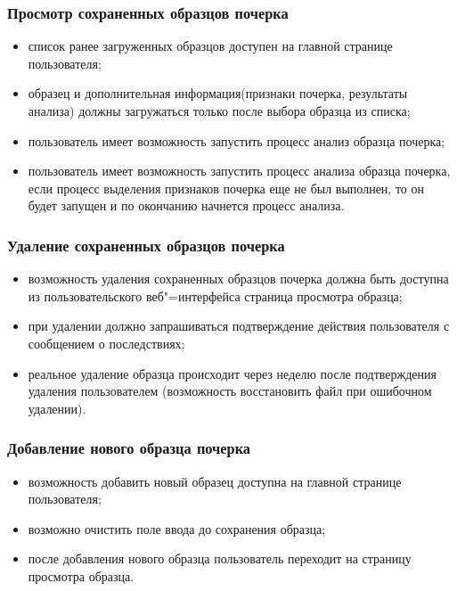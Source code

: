 \subsubsection{Просмотр сохраненных образцов почерка}
\label{sec:freq:show}
\begin{itemize}
	\item список ранее загруженных образцов доступен на главной странице пользователя;
	\item образец и дополнительная информация(признаки почерка, результаты анализа) должны загружаться только после выбора образца из списка;
	\item пользователь имеет возможность запустить процесс анализ образца почерка;
	\item пользователь имеет возможность запустить процесс анализа образца почерка, если процесс выделения признаков почерка еще не был выполнен, то он будет запущен и по окончанию начнется процесс анализа.
\end{itemize}

\subsubsection{Удаление сохраненных образцов почерка}
\label{sec:freq:delete}
\begin{itemize}
	\item возможность удаления сохраненных образцов почерка должна быть доступна из пользовательского веб"=интерфейса страница просмотра образца;
	\item при удалении должно запрашиваться подтверждение действия пользователя с сообщением о последствиях;
	\item реальное удаление образца происходит через неделю после подтверждения удаления пользователем (возможность восстановить файл при ошибочном удалении).
\end{itemize}

\subsubsection{Добавление нового образца почерка}
\label{sec:freq:add}
\begin{itemize}
	\item возможность добавить новый образец доступна на главной странице пользователя;
	\item возможно очистить поле ввода до сохранения образца;
	\item после добавления нового образца пользователь переходит на страницу просмотра образца.
\end{itemize}

